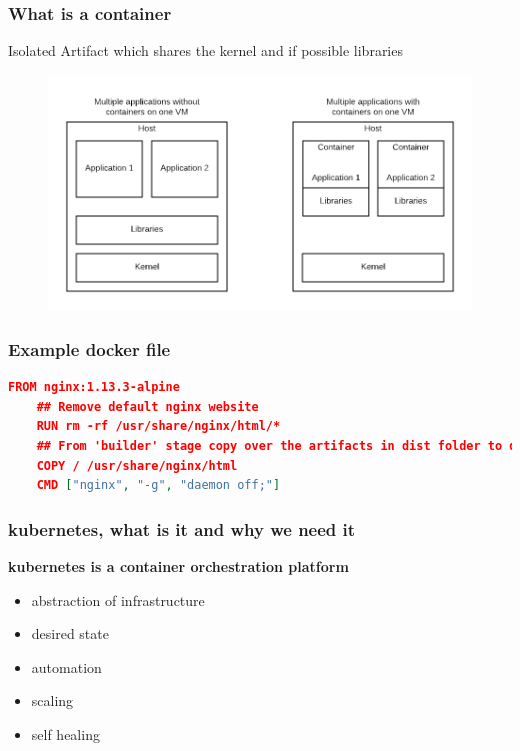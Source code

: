\documentclass{beamer}
\begin{document}
\begin{frame}
\frametitle{What is a container}
Isolated Artifact which shares the kernel and if possible libraries
    \begin{figure}
        \includegraphics[width=\linewidth]{images/ContainerComparsion.png}
    \end{figure}
\end{frame}

\begin{frame}[fragile]
\frametitle{Example docker file}
\textbf{}
\begin{lstlisting}[language=json,firstnumber=1]
    FROM nginx:1.13.3-alpine
    ## Remove default nginx website
    RUN rm -rf /usr/share/nginx/html/*
    ## From 'builder' stage copy over the artifacts in dist folder to default nginx public folder
    COPY / /usr/share/nginx/html
    CMD ["nginx", "-g", "daemon off;"]
\end{lstlisting}
\end{frame}


\begin{frame}
\frametitle{kubernetes, what is it and why we need it}
\textbf{kubernetes is a container orchestration platform}
\\
    \begin{itemize}
        \item abstraction of infrastructure
        \item desired state
        \item automation
        \item scaling
        \item self healing
    \end{itemize}
\end{frame}
\end{document}

